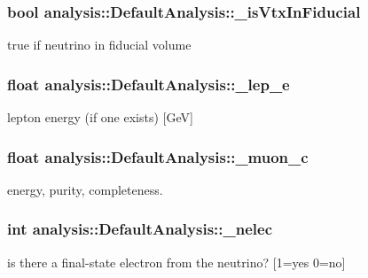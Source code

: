 \subsubsection[{\texorpdfstring{\+\_\+is\+Vtx\+In\+Fiducial}{_isVtxInFiducial}}]{\setlength{\rightskip}{0pt plus 5cm}bool analysis\+::\+Default\+Analysis\+::\+\_\+is\+Vtx\+In\+Fiducial\hspace{0.3cm}{\ttfamily [private]}}\hypertarget{classanalysis_1_1DefaultAnalysis_a3235e005677abb89da08d1668257bca3}{}\label{classanalysis_1_1DefaultAnalysis_a3235e005677abb89da08d1668257bca3}
true if neutrino in fiducial volume 
\subsubsection[{\texorpdfstring{\+\_\+lep\+\_\+e}{_lep_e}}]{\setlength{\rightskip}{0pt plus 5cm}float analysis\+::\+Default\+Analysis\+::\+\_\+lep\+\_\+e\hspace{0.3cm}{\ttfamily [private]}}\hypertarget{classanalysis_1_1DefaultAnalysis_ab00e533228597e83340a23d04b986086}{}\label{classanalysis_1_1DefaultAnalysis_ab00e533228597e83340a23d04b986086}
lepton energy (if one exists) \mbox{[}GeV\mbox{]} 
\subsubsection[{\texorpdfstring{\+\_\+muon\+\_\+c}{_muon_c}}]{\setlength{\rightskip}{0pt plus 5cm}float analysis\+::\+Default\+Analysis\+::\+\_\+muon\+\_\+c\hspace{0.3cm}{\ttfamily [private]}}\hypertarget{classanalysis_1_1DefaultAnalysis_ac6226239ce3915d1363f8038583e8960}{}\label{classanalysis_1_1DefaultAnalysis_ac6226239ce3915d1363f8038583e8960}
energy, purity, completeness. 
\subsubsection[{\texorpdfstring{\+\_\+nelec}{_nelec}}]{\setlength{\rightskip}{0pt plus 5cm}int analysis\+::\+Default\+Analysis\+::\+\_\+nelec\hspace{0.3cm}{\ttfamily [private]}}\hypertarget{classanalysis_1_1DefaultAnalysis_a6aa372d8781339f60a044c92d974ae53}{}\label{classanalysis_1_1DefaultAnalysis_a6aa372d8781339f60a044c92d974ae53}
is there a final-\/state electron from the neutrino? \mbox{[}1=yes 0=no\mbox{]} 
